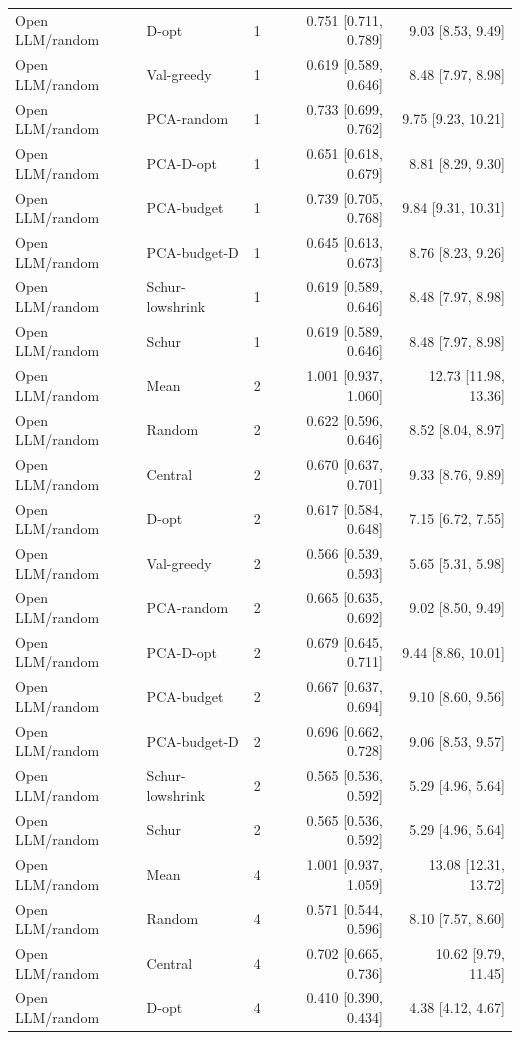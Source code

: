 \begin{longtable}{lllrr}
Open LLM/random & D-opt & 1 & 0.751 [0.711, 0.789] & 9.03 [8.53, 9.49]\\
Open LLM/random & Val-greedy & 1 & 0.619 [0.589, 0.646] & 8.48 [7.97, 8.98]\\
Open LLM/random & PCA-random & 1 & 0.733 [0.699, 0.762] & 9.75 [9.23, 10.21]\\
Open LLM/random & PCA-D-opt & 1 & 0.651 [0.618, 0.679] & 8.81 [8.29, 9.30]\\
Open LLM/random & PCA-budget & 1 & 0.739 [0.705, 0.768] & 9.84 [9.31, 10.31]\\
Open LLM/random & PCA-budget-D & 1 & 0.645 [0.613, 0.673] & 8.76 [8.23, 9.26]\\
Open LLM/random & Schur-lowshrink & 1 & 0.619 [0.589, 0.646] & 8.48 [7.97, 8.98]\\
Open LLM/random & Schur & 1 & 0.619 [0.589, 0.646] & 8.48 [7.97, 8.98]\\
Open LLM/random & Mean & 2 & 1.001 [0.937, 1.060] & 12.73 [11.98, 13.36]\\
Open LLM/random & Random & 2 & 0.622 [0.596, 0.646] & 8.52 [8.04, 8.97]\\
Open LLM/random & Central & 2 & 0.670 [0.637, 0.701] & 9.33 [8.76, 9.89]\\
Open LLM/random & D-opt & 2 & 0.617 [0.584, 0.648] & 7.15 [6.72, 7.55]\\
Open LLM/random & Val-greedy & 2 & 0.566 [0.539, 0.593] & 5.65 [5.31, 5.98]\\
Open LLM/random & PCA-random & 2 & 0.665 [0.635, 0.692] & 9.02 [8.50, 9.49]\\
Open LLM/random & PCA-D-opt & 2 & 0.679 [0.645, 0.711] & 9.44 [8.86, 10.01]\\
Open LLM/random & PCA-budget & 2 & 0.667 [0.637, 0.694] & 9.10 [8.60, 9.56]\\
Open LLM/random & PCA-budget-D & 2 & 0.696 [0.662, 0.728] & 9.06 [8.53, 9.57]\\
Open LLM/random & Schur-lowshrink & 2 & 0.565 [0.536, 0.592] & 5.29 [4.96, 5.64]\\
Open LLM/random & Schur & 2 & 0.565 [0.536, 0.592] & 5.29 [4.96, 5.64]\\
Open LLM/random & Mean & 4 & 1.001 [0.937, 1.059] & 13.08 [12.31, 13.72]\\
Open LLM/random & Random & 4 & 0.571 [0.544, 0.596] & 8.10 [7.57, 8.60]\\
Open LLM/random & Central & 4 & 0.702 [0.665, 0.736] & 10.62 [9.79, 11.45]\\
Open LLM/random & D-opt & 4 & 0.410 [0.390, 0.434] & 4.38 [4.12, 4.67]\\

\end{longtable}
